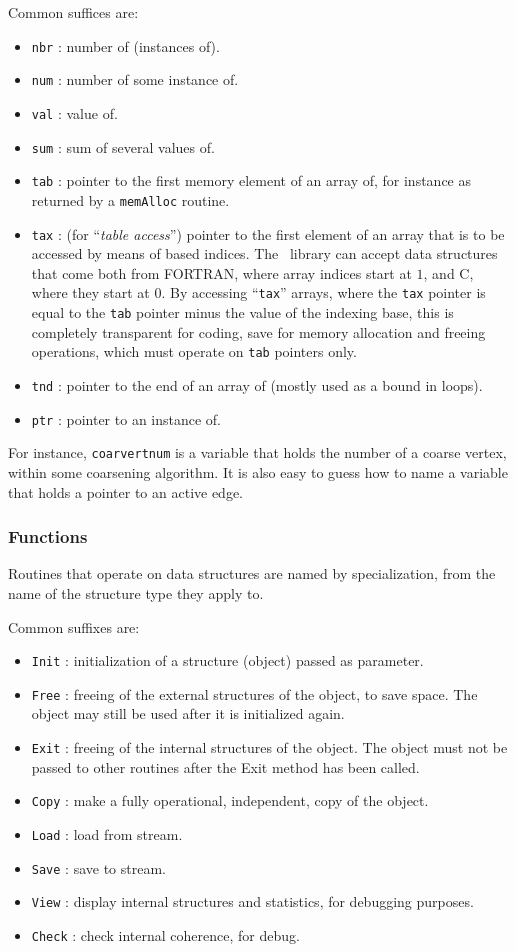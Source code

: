 Common suffices are:
\begin{itemize}
\item
{\tt nbr} : number of (instances of).
\item
{\tt num} : number of some instance of.
\item
{\tt val} : value of.
\item
{\tt sum} : sum of several values of.
\item
{\tt tab} : pointer to the first memory element of an array of, for
instance as returned by a {\tt mem\lbt Alloc} routine.
\item
{\tt tax} : (for ``{\it table access}'') pointer to the first element
of an array that is to be accessed by means of based indices. The
\libscotch\ library can accept data structures that come both from
FORTRAN, where array indices start at $1$, and C, where they start at
$0$. By accessing ``{\tt tax}'' arrays, where the {\tt tax} pointer is
equal to the {\tt tab} pointer minus the value of the indexing base,
this is completely transparent for coding, save for memory allocation
and freeing operations, which must operate on {\tt tab} pointers only.
\item
{\tt tnd} : pointer to the end of an array of (mostly used as a bound
in loops).
\item
{\tt ptr} : pointer to an instance of.
\end{itemize}

For instance, {\tt coarvertnum} is a variable that holds the number of
a coarse vertex, within some coarsening algorithm. It is also easy to
guess how to name a variable that holds a pointer to an active edge.

\subsubsection{Functions}

Routines that operate on data structures are named by specialization,
from the name of the structure type they apply to.

Common suffixes are:
\begin{itemize}
\item
{\tt Init} : initialization of a structure (object) passed as parameter.
\item
{\tt Free} : freeing of the external structures of the object, to save
space. The object may still be used after it is initialized again.
\item
{\tt Exit} : freeing of the internal structures of the object. The
object must not be passed to other routines after the {Exit} method
has been called.
\item
{\tt Copy} : make a fully operational, independent, copy of the object.
\item
{\tt Load} : load from stream.
\item
{\tt Save} : save to stream.
\item
{\tt View} : display internal structures and statistics, for debugging
purposes.
\item
{\tt Check} : check internal coherence, for debug.
\end{itemize}

